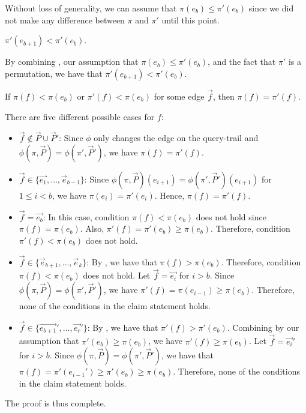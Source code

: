 Without loss of generality, we can assume that $\pi(e_b) \leq \pi'(e_b)$ since we did not make any difference between $\pi$ and $\pi'$ until this point.

\begin{observation}\label{obs:branch-begin}
$\pi'(e_{b+1}) < \pi'(e_b)$.
\end{observation}
\begin{myproof}
By combining , our assumption that $\pi(e_b) \leq \pi'(e_b)$, and the fact that $\pi'$ is a permutation, we have that $\pi'(e_{b+1}) < \pi'(e_b)$.
\end{myproof}

\begin{claim}\label{clm:equal-ranks}
If $\pi(f) < \pi(e_b)$ or $\pi'(f) < \pi(e_b)$ for some edge $\vec{f}$, then $\pi(f) = \pi'(f)$.
\end{claim}
\begin{myproof}
There are five different possible cases for $f$:
\begin{itemize}
    \item $\vec{f} \notin \vec{P} \cup \vec{P}'$: Since $\phi$ only changes the edge on the query-trail and $\phi(\pi, \vec{P})=\phi(\pi', \vec{P}')$, we have $\pi(f) = \pi'(f)$. 
    \item $\vec{f} \in \{\vec{e_1}, \ldots, \vec{e}_{b-1}\}$: Since $\phi(\pi, \vec{P})(e_{i+1}) = \phi(\pi', \vec{P}')(e_{i+1})$ for $1 \leq i < b$, we have $\pi(e_i) = \pi'(e_i)$. Hence, $\pi(f) = \pi'(f)$.
    \item $\vec{f}=\vec{e_b}$: In this case, condition $\pi(f) < \pi(e_b)$ does not hold since $\pi(f) = \pi(e_b)$. Also, $\pi'(f)=\pi'(e_b) \geq \pi(e_b)$. Therefore, condition $\pi'(f) < \pi(e_b)$ does not hold. 
    \item $\vec{f}\in \{\vec{e}_{b+1}, \ldots, \vec{e}_k\}$: By , we have that $\pi(f) > \pi(e_b)$. Therefore, condition $\pi(f) < \pi(e_b)$ does not hold. Let $\vec{f}=\vec{e_i}$ for $i > b$. Since $\phi(\pi, \vec{P}) = \phi(\pi', \vec{P}')$, we have $\pi'(f) = \pi(e_{i-1}) \geq \pi(e_b)$. Therefore, none of the conditions in the claim statement holds.
    \item $\vec{f}\in \{\vec{e_{b+1}}', \ldots, \vec{e_r}'\}$: By , we have that $\pi'(f) > \pi'(e_b)$. Combining by our assumption that $\pi'(e_b) \geq \pi(e_b)$, we have $\pi'(f) \geq \pi(e_b)$. Let $\vec{f}=\vec{e_i}'$ for $i > b$. Since $\phi(\pi, \vec{P}) = \phi(\pi', \vec{P}')$, we have that $\pi(f) = \pi'(e_{i-1}') \geq \pi'(e_b) \geq \pi(e_b)$. Therefore, none of the conditions in the claim statement holds.
\end{itemize}
The proof is thus complete.
\end{myproof}

